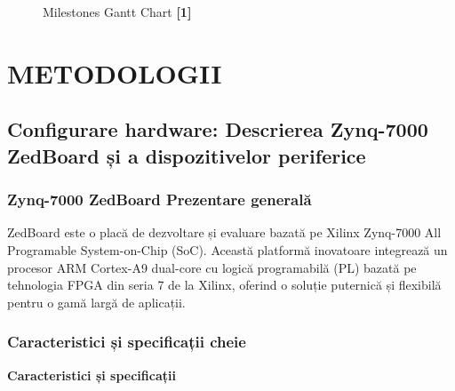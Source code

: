 \documentclass[12pt]{article}
\begin{document}
\begin{figure}[ht]
\centering
\caption{Milestones Gantt Chart \textbf{[1]}}
\end{figure}



\newpage
\section{\uppercase{Metodologii}}
\subsection{Configurare hardware: Descrierea Zynq-7000 ZedBoard și a dispozitivelor periferice}

\subsubsection{Zynq-7000 ZedBoard Prezentare generală}

\hspace*{1cm}ZedBoard este o placă de dezvoltare și evaluare bazată pe Xilinx Zynq-7000 All Programable System-on-Chip (SoC). Această platformă inovatoare integrează un procesor ARM Cortex-A9 dual-core cu logică programabilă (PL) bazată pe tehnologia FPGA din seria 7 de la Xilinx, oferind o soluție puternică și flexibilă pentru o gamă largă de aplicații.

\subsubsection{Caracteristici și specificații cheie}

\textbf{Caracteristici și specificații}
\end{document}
